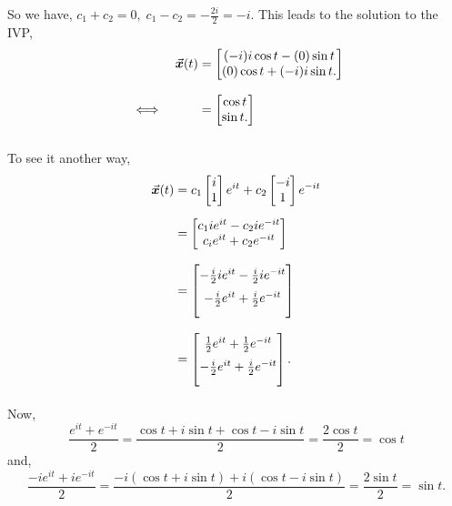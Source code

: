 \documentclass[../MathsNotesBase.tex]{subfiles}
\begin{document}
{\begin{exe}
{				So we have, ${ c_1 + c_2 = 0, \; c_1 - c_2 = -\frac{2i}{2} = -i }$. This leads to the solution to the IVP,
				\[\begin{aligned}
					&& \x(t) &= \begin{bmatrix}
						(-i) i \cos{t} - (0) \sin{t} \\
						(0) \cos{t} + (-i) i \sin{t}.
					\end{bmatrix} \nnn
					&\iff &  &= \begin{bmatrix}
						\cos{t} \\
						\sin{t}.
					\end{bmatrix} \nnn
				\end{aligned}\]
				
				To see it another way,
				\[\begin{aligned}
					\x(t) &= c_1 \begin{bmatrix}i\\ 1\end{bmatrix} e^{it} + c_2 \begin{bmatrix}-i\\ 1\end{bmatrix} e^{-it} \nn
					&=  \begin{bmatrix}
						c_1 i e^{it} - c_2 i e^{-it} \\
						c_i e^{it} + c_2 e^{-it}
					\end{bmatrix} \nnn
					&=  \begin{bmatrix}
						-\frac{i}{2} i e^{it} - \frac{i}{2} i e^{-it} \nn
						-\frac{i}{2} e^{it} + \frac{i}{2} e^{-it} \nn
					\end{bmatrix} \nnn
					&=  \begin{bmatrix}
						\frac{1}{2} e^{it} + \frac{1}{2} e^{-it} \nn
						-\frac{i}{2} e^{it} + \frac{i}{2} e^{-it} \nn
					\end{bmatrix}. \nnn
				\end{aligned}\]
				Now,
				\[ \frac{e^{it} + e^{-it}}{2} = \frac{\cos{t} + i \sin{t} + \cos{t} - i \sin{t}}{2} = \frac{2\cos{t}}{2} = \cos{t} \]
				and,
				\[ \frac{-i e^{it} + i e^{-it}}{2} = \frac{ -i (\cos{t} + i \sin{t}) + i (\cos{t} - i \sin{t}) }{2} = \frac{2\sin{t}}{2} = \sin{t}. \]
			}
		\end{exe}
		
		
		\biggerskip
		
	}
\end{document}
